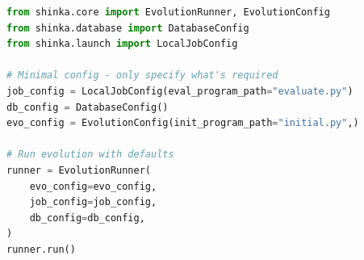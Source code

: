 \documentclass[11pt, a4paper]{include/gdm_format}
\newcommand{\ouralgo}{\textsc{ShinkaEvolve}\xspace}
\begin{document}
\begin{minipage}{\textwidth}
\begin{lstlisting}[language=Python, basicstyle=\ttfamily\tiny, caption={Minimal \ouralgo configuration and usage example.}, label={lst:shinka_usage}]
from shinka.core import EvolutionRunner, EvolutionConfig
from shinka.database import DatabaseConfig
from shinka.launch import LocalJobConfig

# Minimal config - only specify what's required
job_config = LocalJobConfig(eval_program_path="evaluate.py")
db_config = DatabaseConfig()
evo_config = EvolutionConfig(init_program_path="initial.py",)

# Run evolution with defaults
runner = EvolutionRunner(
    evo_config=evo_config,
    job_config=job_config,
    db_config=db_config,
)
runner.run()
\end{lstlisting}
\end{minipage}

\vspace{0.5em}
\end{document}
